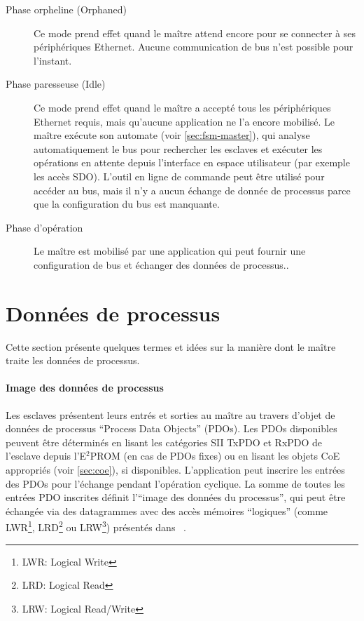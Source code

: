 \documentclass[a4paper,12pt,BCOR=6mm,bibtotoc,idxtotoc]{scrbook}
\begin{document}
\begin{description}

\item[Phase orpheline (Orphaned)] Ce mode prend
  effet quand le ma\^itre attend encore pour se connecter \`a ses
  p\'eriph\'eriques Ethernet. Aucune communication de bus n'est possible
  pour l'instant.

\item[Phase paresseuse (Idle)] Ce mode prend effet
  quand le ma\^itre a accept\'e tous les p\'eriph\'eriques Ethernet
  requis, mais qu'aucune application ne l'a encore mobilis\'e. Le
  ma\^itre ex\'ecute son automate (voir \autoref{sec:fsm-master}), qui
  analyse automatiquement le bus pour rechercher les esclaves et
  ex\'ecuter les op\'erations en attente depuis l'interface en espace
  utilisateur (par exemple les acc\`es SDO).  L'outil en ligne de
  commande peut \^etre utilis\'e pour acc\'eder au bus, mais il n'y a
  aucun \'echange de donn\'ee de processus parce que la configuration
  du bus est manquante.

\item[Phase d'op\'eration] Le ma\^itre est
  mobilis\'e par une application qui peut fournir une configuration de
  bus et \'echanger des donn\'ees de processus..

\end{description}


\section{Donn\'ees de processus}
\label{sec:processdata}

Cette section pr\'esente quelques termes et id\'ees sur la mani\`ere
dont le ma\^itre traite les donn\'ees de processus.

\paragraph{Image des donn\'ees de processus}

Les esclaves pr\'esentent leurs entr\'es et sorties au ma\^itre au
travers d'objet de donn\'ees de processus ``Process Data Objects''
(PDOs). Les PDOs disponibles peuvent \^etre d\'etermin\'es
en lisant les cat\'egories SII TxPDO et RxPDO de l'esclave depuis
l'E$^2$PROM (en cas de PDOs fixes) ou en lisant les objets CoE
appropri\'es (voir \autoref{sec:coe}), si disponibles. L'application
peut inscrire les entr\'ees des PDOs pour l'\'echange pendant
l'op\'eration cyclique.  La somme de toutes les entr\'ees PDO
inscrites d\'efinit l'``image des donn\'ees du processus'', qui peut
\^etre \'echang\'ee via des datagrammes avec des acc\`es m\'emoires
``logiques'' (comme LWR\footnote{LWR: Logical Write},
LRD\footnote{LRD: Logical Read} ou LRW\footnote{LRW: Logical
Read/Write}) pr\'esent\'es dans ~\cite[sec.~5.4]{dlspec}.
\end{document}
